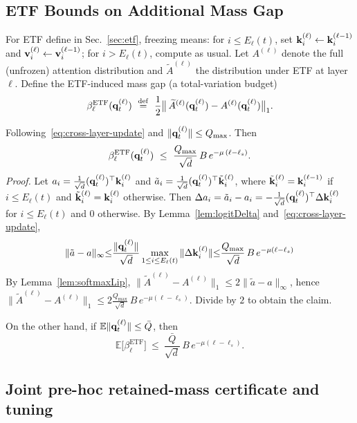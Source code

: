 \subsection{ETF Bounds on Additional Mass Gap}
\label{sec:etf-bound}
For ETF define in Sec.~\ref{sec:etf}, freezing means: for $i\le E_\ell(t)$, set
$\mathbf{k}^{(\ell)}_i\leftarrow \mathbf{k}^{(\ell-1)}_i$ and $\mathbf{v}^{(\ell)}_i\leftarrow \mathbf{v}^{(\ell-1)}_i$; for $i> E_\ell(t)$, compute as usual. Let $A^{(\ell)}$ denote the full (unfrozen) attention distribution and
$\widetilde A^{(\ell)}$ the distribution under ETF at layer $\ell$. Define the ETF-induced mass gap (a total-variation budget)
\[
\beta^{\mathrm{ETF}}_\ell(\mathbf{q}^{(\ell)}_t)
\ \stackrel{\mathrm{def}}{=}\ \frac12\big\|\,\widetilde A^{(\ell)}(\mathbf{q}^{(\ell)}_t)-A^{(\ell)}(\mathbf{q}^{(\ell)}_t)\big\|_1.
\]

\begin{theorem}
\label{thm:ETF}
Following~\eqref{eq:cross-layer-update} and $\|\mathbf{q}^{(\ell)}_t\|\le Q_{\max}$. Then
\[
\beta^{\mathrm{ETF}}_\ell(\mathbf{q}^{(\ell)}_t)
\ \le\
\frac{Q_{\max}}{\sqrt d}\,B\,e^{-\mu\,(\ell-\ell_s)}.
\]
\emph{Proof.}
Let $a_i=\frac{1}{\sqrt d}(\mathbf{q}^{(\ell)}_t)^\top \mathbf{k}^{(\ell)}_i$
and $\tilde a_i=\frac{1}{\sqrt d}(\mathbf{q}^{(\ell)}_t)^\top \tilde {\mathbf{k}}^{(\ell)}_i$, where
$\tilde {\mathbf{k}}^{(\ell)}_i=\mathbf{k}^{(\ell-1)}_i$ if $i\le E_\ell(t)$ and
$\tilde {\mathbf{k}}^{(\ell)}_i=\mathbf{k}^{(\ell)}_i$ otherwise. Then $\Delta a_i=\tilde a_i-a_i=-\frac{1}{\sqrt d}(\mathbf{q}^{(\ell)}_t)^\top \Delta\mathbf{k}^{(\ell)}_i$
for $i\le E_\ell(t)$ and $0$ otherwise.
By Lemma~\ref{lem:logitDelta} and~\eqref{eq:cross-layer-update},
\begin{equation}
\begin{aligned}
\|\tilde a-a\|_\infty
{\le}
\frac{\|\mathbf{q}^{(\ell)}_t\|}{\sqrt d}
\max_{1\le i \le E_\ell(t)} \|\Delta\mathbf{k}^{(\ell)}_i\|
{\le}
\frac{Q_{\max}}{\sqrt d}\,B\,e^{-\mu(\ell-\ell_s)}
\end{aligned}
\end{equation}
By Lemma~\ref{lem:softmaxLip},
$\|\widetilde A^{(\ell)}-A^{(\ell)}\|_1 \le 2 \|\tilde a-a\|_\infty$,
hence
$\|\widetilde A^{(\ell)}-A^{(\ell)}\|_1
\le 2 \frac{Q_{\max}}{\sqrt d}\,B\,e^{-\mu(\ell-\ell_s)}$.
Divide by $2$ to obtain the claim.
\qedhere
\end{theorem}

On the other hand, if $\mathbb{E}\|\mathbf{q}^{(\ell)}_t\|\le \bar Q$, then
\[
\mathbb{E}\big[\beta^{\mathrm{ETF}}_\ell\big]
\ \le\
\frac{\bar Q}{\sqrt d}\,B\,e^{-\mu(\ell-\ell_s)}.
\]

\subsection{Joint pre-hoc retained-mass certificate and tuning}

